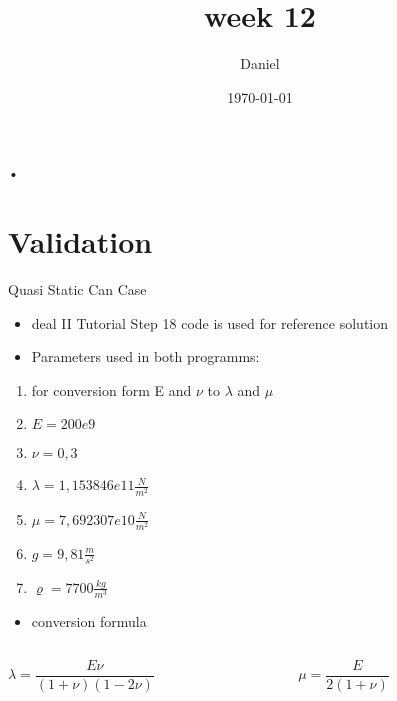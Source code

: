 \documentclass[11pt]{beamer}
\author{Daniel}
\title{week 12}
\date[\today]{\today}
\begin{document}
\begin{frame}{•}
\titlepage
\end{frame}

\section{Validation}
\begin{frame}{Quasi Static Can Case}
\begin{itemize}
\item deal II Tutorial Step 18 code is used for reference solution 
\item Parameters used in both programms:
\end{itemize}
\begin{enumerate}
\item for conversion form E and $\nu$ to $\lambda$ and $\mu$
\item $E=200e9$
\item $\nu=0,3$
\item $ \lambda = 1,153846e11 \frac{N}{m^{2}}$
\item $ \mu = 7,692307e10 \frac{N}{m^{2}} $
\item $g =9,81 \frac{m}{s^{2}}$
\item $\varrho = 7700 \frac{kg}{m^{3}} $ 
\end{enumerate}
\begin{itemize}
\item conversion formula
\end{itemize}
\begin{columns}
\begin{column}{0.4\textwidth}
$\lambda=\dfrac{E\nu}{(1+\nu)(1-2\nu)}$
\end{column}
\begin{column}{0.4\textwidth}
$\mu=\dfrac{E}{2(1+\nu)}$
\end{column}
\end{columns}
\end{frame}
\end{document}
